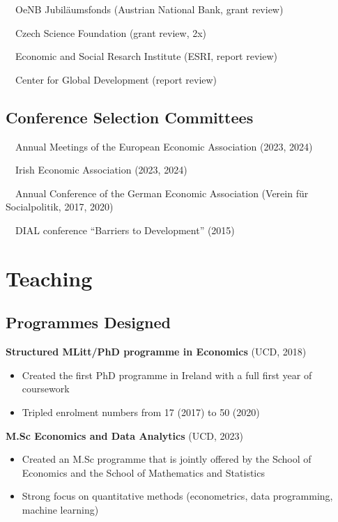 \documentclass[10pt,a4paper,]{article}
\providecommand{\tightlist}{%
  \setlength{\itemsep}{0pt}\setlength{\parskip}{0pt}}
\begin{document}
~~OeNB Jubiläumsfonds (Austrian National Bank, grant review)

~~Czech Science Foundation (grant review, 2x)

~~Economic and Social Resarch Institute (ESRI, report review)

~~Center for Global Development (report review)

\hypertarget{conference-selection-committees}{%
\subsection{Conference Selection
Committees}\label{conference-selection-committees}}

~~Annual Meetings of the European Economic Association (2023, 2024)

~~Irish Economic Association (2023, 2024)

~~Annual Conference of the German Economic Association (Verein für
Socialpolitik, 2017, 2020)

~~DIAL conference ``Barriers to Development'' (2015)

\hypertarget{teaching}{%
\section{Teaching}\label{teaching}}

\hypertarget{programmes-designed}{%
\subsection{Programmes Designed}\label{programmes-designed}}

\textbf{Structured MLitt/PhD programme in Economics} (UCD, 2018)

\begin{itemize}
\tightlist
\item
  Created the first PhD programme in Ireland with a full first year of
  coursework
\item
  Tripled enrolment numbers from 17 (2017) to 50 (2020)
\end{itemize}

\medskip

\textbf{M.Sc Economics and Data Analytics} (UCD, 2023)

\begin{itemize}
\tightlist
\item
  Created an M.Sc programme that is jointly offered by the School of
  Economics and the School of Mathematics and Statistics
\item
  Strong focus on quantitative methods (econometrics, data programming,
  machine learning)
\end{itemize}
\end{document}
